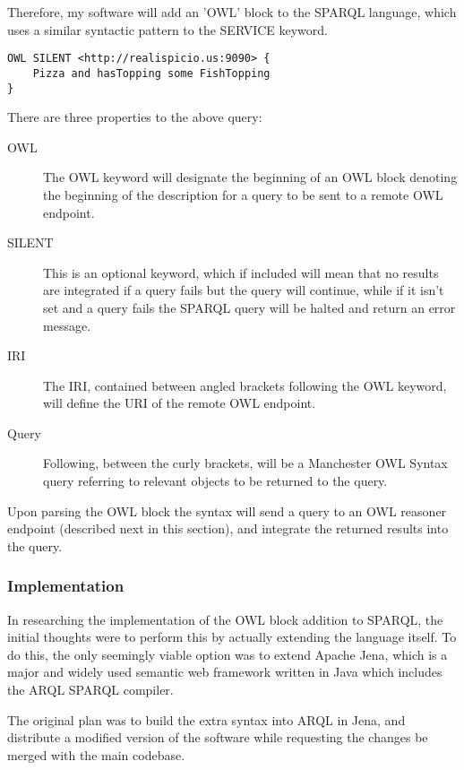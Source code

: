 \documentclass{article}
\begin{document}
Therefore, my software will add an 'OWL' block to the SPARQL language, which
uses a similar syntactic pattern to the SERVICE keyword.

\begin{lstlisting}
OWL SILENT <http://realispicio.us:9090> {
    Pizza and hasTopping some FishTopping
}
\end{lstlisting}

There are three properties to the above query:

\begin{description}
    \item[OWL] The OWL keyword will designate the beginning of an OWL block
    denoting the beginning of the description for a query to be sent to a remote
    OWL endpoint.
    \item[SILENT] This is an optional keyword, which if included will mean that
    no results are integrated if a query fails but the query will continue,
    while if it isn't set and a query fails the SPARQL query will be halted and
    return an error message.
    \item[IRI] The IRI, contained between angled brackets following the OWL
    keyword, will define the URI of the remote OWL endpoint.
    \item[Query] Following, between the curly brackets, will be a Manchester OWL
    Syntax query referring to relevant objects to be returned to the query.
\end{description}

Upon parsing the OWL block the syntax will send a query to an OWL reasoner
endpoint (described next in this section), and integrate the returned results
into the query. 

\subsubsection{Implementation}

In researching the implementation of the OWL block addition to SPARQL, the
initial thoughts were to perform this by actually extending the language itself.
To do this, the only seemingly viable option was to extend Apache Jena, which is
a major and widely used semantic web framework written in Java which includes the 
ARQL SPARQL compiler. 

The original plan was to build the extra syntax into ARQL in Jena, and
distribute a modified version of the software while requesting the changes be
merged with the main codebase.
\end{document}
